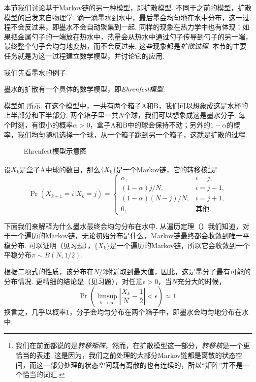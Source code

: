 本节我们讨论基于Markov链的另一种模型，即扩散模型. 不同于之前的模型，扩散模型的启发来自物理学. 滴一滴墨水到水中，最后墨会均匀地在水中分布，这一过程不会反过来，即墨水不会自动聚集到一起. 同样的现象在热力学中也有体现：如果把金属勺子的一端放在热水中，热量会从热水中通过勺子传导到勺子的另一端，最终整个勺子会均匀地变热，而不会反过来. 这些现象都是\emph{扩散过程}. 本节的主要任务就是为这一过程建立数学模型，并讨论它的应用. 

我们先看墨水的例子. 
\begin{example}[墨水的扩散]\label{ex:ink-diffusion}
墨水的扩散有一个具体的数学模型，即\emph{Ehrenfest模型}. 

模型如 所示. 在这个模型中，一共有两个箱子A和B，我们可以想象成这是水杯的上半部分和下半部分. 两个箱子里一共$N$个球，我们可以想象成这是墨水分子. 每个时刻，有很小的概率$\alpha>0$，盒子A和B中的球会保持不动；另外的$1-\alpha$的概率，我们均匀随机选择一个球，从一个箱子跳到另一个箱子，这就是扩散的过程. 

\begin{figure}[ht]
    \centering
    \scalebox{0.7}{}
    \caption{Ehrenfest模型示意图}\label{fig:ehrenfest-model}
\end{figure}

设$X_k$是盒子A中球的数目，那么$\{X_k\}$是一个Markov链，它的转移核\footnote{我们在前面都说的是\emph{转移矩阵}，然而，在扩散模型这一部分，\emph{转移核}是一个更恰当的表述. 这是因为，我们之前处理的大部分Markov链都是离散的状态空间，而这一部分处理的状态空间既有离散的也有连续的，所以“矩阵”并不是一个恰当的词汇. }是
\[
    \Pr(X_{k+1}=i|X_k=j) = \begin{cases}
        \alpha, & i = j,\\
        (1-\alpha)j/N, & i = j-1,\\
        (1-\alpha)(N-j)/N, & i = j+1,\\
        0, & \text{其他}.
    \end{cases}
\]

下面我们来解释为什么墨水最终会均匀分布在水中. 从遍历定理（）我们知道，对于一个遍历的Markov链，无论初始分布是什么，Markov链最终都会收敛到唯一平稳分布. 可以证明（见习题），$\{X_k\}$是一个遍历的Markov链，所以它会收敛到一个平稳分布$\pi\sim B(N,1/2)$. 

根据二项式的性质，该分布在$N/2$附近取到最大值，因此，这是墨分子最有可能的分布情况. 更精细的结论是（见习题），对任意$\epsilon>0$，当$N$充分大的时候，
\[
    \Pr\left(\limsup_{k\to\infty}\left|\frac{X_k}{N}-\frac{1}{2}\right|<\epsilon\right) \approx 1.
\]
换言之，几乎以概率$1$，分子会均匀分布在两个箱子中，即墨水会均匀地分布在水中.
\end{example}

